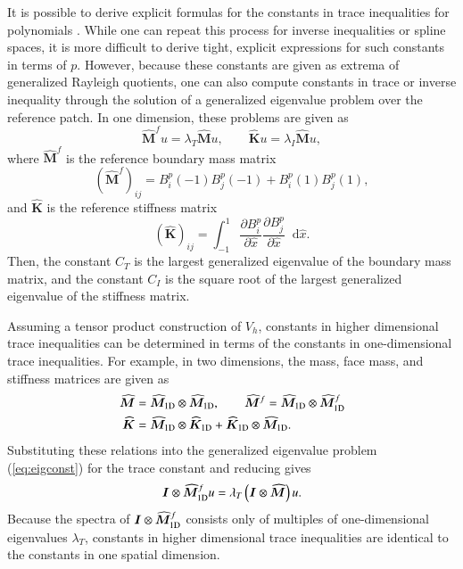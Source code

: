 \documentclass[preprint,10pt]{elsarticle}
\newcommand{\pd}[2]{\frac{\partial#1}{\partial#2}}
\newcommand{\LRp}[1]{\left( #1 \right)}
\newcommand*\diff[1]{\mathop{}\!{\mathrm{d}#1}}
\begin{document}
It is possible to derive explicit formulas for the constants in trace inequalities for polynomials \cite{warburton2003constants, hillewaert2011sharp, chan2015hp}.  While one can repeat this process for inverse inequalities or spline spaces, it is more difficult to derive tight, explicit expressions for such constants in terms of $p$.  However, because these constants are given as extrema of generalized Rayleigh quotients, one can also compute constants in trace or inverse inequality through the solution of a generalized eigenvalue problem over the reference patch.  In one dimension, these problems are given as
\begin{equation}
\widehat{\bm{M}}^fu = \lambda_T\widehat{\bm{M}}u, \qquad \widehat{\bm{K}}u = \lambda_I\widehat{\bm{M}}u,
\label{eq:eigconst}
\end{equation}
where $\widehat{\bm{M}}^f$ is the reference boundary mass matrix
\[
\LRp{\widehat{\bm{M}}^f}_{ij} = B^p_i(-1) B^p_j(-1) + B^p_i(1) B^p_j(1),
\]
and $\widehat{\bm{K}}$ is the reference stiffness matrix
\[
\LRp{\widehat{\bm{K}}}_{ij} = \int_{-1}^1 \pd{B^p_i}{\widehat{x}}\pd{B^p_j}{\widehat{x}} \diff{\widehat{x}}.
\]
{\color{forestgreen} Then, the constant $C_T$ is the largest generalized eigenvalue of the boundary mass matrix, and the constant $C_I$ is the square root of the largest generalized eigenvalue of the stiffness matrix.}

Assuming a tensor product construction of $V_h$, constants in higher dimensional trace inequalities can be determined in terms of the constants in one-dimensional trace inequalities.  For example, in two dimensions, the mass, face mass, and stiffness matrices are given as
\begin{align*}
\widehat{\bm{M}} &= \widehat{\bm{M}}_{\rm 1D}\otimes \widehat{\bm{M}}_{\rm 1D}, \qquad \widehat{\bm{M}}^f = \widehat{\bm{M}}_{\rm 1D}\otimes \widehat{\bm{M}}^f_{\rm 1D}\\
\widehat{\bm{K}} &= \widehat{\bm{M}}_{\rm 1D}\otimes \widehat{\bm{K}}_{\rm 1D} + \widehat{\bm{K}}_{\rm 1D} \otimes \widehat{\bm{M}}_{\rm 1D}.
\end{align*}
Substituting these relations into the generalized eigenvalue problem (\ref{eq:eigconst}) for the trace constant and reducing gives
\[
\bm{I}\otimes \widehat{\bm{M}}^f_{\rm 1D} u = \lambda_T\LRp{\bm{I}\otimes \widehat{\bm{M}}}u.  
\]
Because the spectra of $\bm{I}\otimes \widehat{\bm{M}}^f_{\rm 1D}$ consists only of multiples of one-dimensional eigenvalues $\lambda_T$, constants in higher dimensional trace inequalities are identical to the constants in one spatial dimension.  
\end{document}
